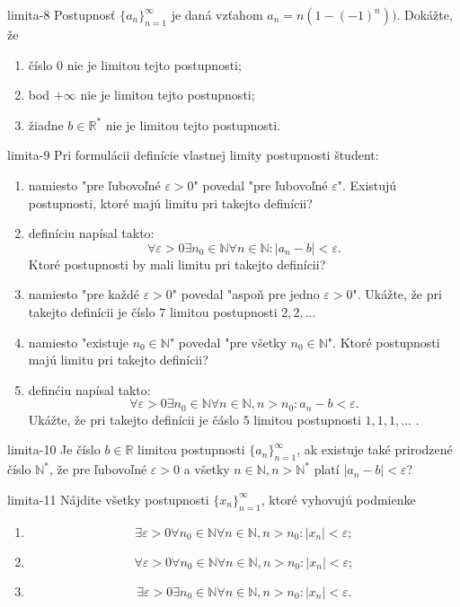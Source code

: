 \begin{defproblem}{limita-8}
Postupnosť ${\{a_n\}}_{n=1}^\infty$ je daná vzťahom $a_n=n(1-(-1)^n)).$ Dokážte, že
\begin{enumerate}
\item číslo $0$ nie je limitou tejto postupnosti;
\item bod $+\infty$ nie je limitou tejto postupnosti;
\item žiadne $b \in \mathbb{R^*}$ nie je limitou tejto postupnosti.
\end{enumerate}
\end{defproblem}

\begin{defproblem}{limita-9}
Pri formulácii definície vlastnej limity postupnosti študent:
\begin{enumerate}
\item namiesto "pre ľubovoľné $\varepsilon > 0$" povedal "pre ľubovoľné $\varepsilon$". Existujú postupnosti, ktoré majú limitu pri takejto definícii?
\item definíciu napísal takto:
$$\forall \varepsilon > 0 \exists n_0 \in \mathbb{N} \forall n \in \mathbb{N}: |a_n-b|<\varepsilon.$$
Ktoré postupnosti by mali limitu pri takejto definícii?
\item namiesto "pre každé $\varepsilon > 0$" povedal "aspoň pre jedno $\varepsilon > 0$". Ukážte, že pri takejto definícii je číslo $7$ limitou postupnosti $2,2, ...$ 
\item namiesto "existuje $n_0 \in \mathbb{N}$" povedal "pre všetky $n_0 \in \mathbb{N}$". Ktoré postupnosti majú limitu pri takejto definícii?
\item definćiu napísal takto:
$$\forall \varepsilon > 0 \exists n_0 \in \mathbb{N} \forall n \in \mathbb{N},n>n_0:a_n-b<\varepsilon.$$
Ukážte, že pri takejto definícii je čáslo $5$ limitou postupnosti $1,1,1,...$ .
\end{enumerate}
\end{defproblem}

\begin{defproblem}{limita-10}
Je číslo $b \in \mathbb{R}$ limitou postupnosti ${\{a_n\}}_{n=1}^\infty$, ak existuje také prirodzené číslo $\mathbb{N^*}$, že pre ľubovoľné $\varepsilon>0$ a všetky $n \in \mathbb{N}, n>\mathbb{N^*}$ platí $|a_n-b|<\varepsilon$? 
\end{defproblem}

\begin{defproblem}{limita-11}
Nájdite všetky postupnosti ${\{x_n\}}_{n=1}^\infty$, ktoré vyhovujú podmienke
\begin{enumerate}
\item $$\exists \varepsilon>0 \forall n_0 \in \mathbb{N} \forall n \in \mathbb{N}, n>n_0: |x_n|<\varepsilon; $$
\item $$\forall \varepsilon>0 \forall n_0 \in \mathbb{N} \forall n \in \mathbb{N}, n>n_0: |x_n|<\varepsilon; $$
\item $$\exists \varepsilon>0 \exists n_0 \in \mathbb{N} \forall n \in \mathbb{N}, n>n_0: |x_n|<\varepsilon. $$
\end{enumerate}
\end{defproblem}

